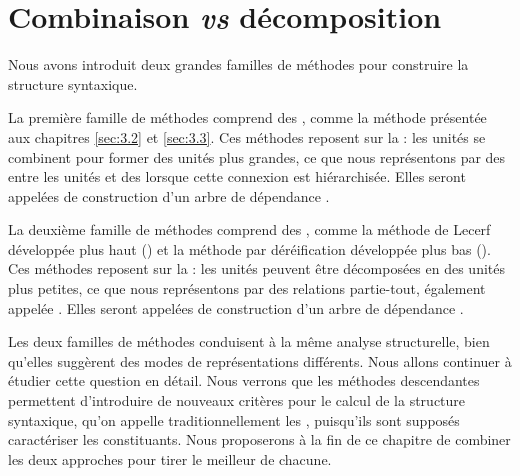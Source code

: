 \section{Combinaison \textit{vs} décomposition}\label{sec:3.4.8}

Nous avons introduit deux grandes familles de méthodes pour construire la structure syntaxique.

La première famille de méthodes comprend des , comme la méthode présentée aux chapitres \ref{sec:3.2} et \ref{sec:3.3}. Ces méthodes reposent sur la  : les unités se combinent pour former des unités plus grandes, ce que nous représentons par des  entre les unités et des  lorsque cette connexion est hiérarchisée. Elles seront appelées  de construction d’un arbre de dépendance .

La deuxième famille de méthodes comprend des , com\-me la méthode de Lecerf développée plus haut () et la méthode par déréification développée plus bas (). Ces méthodes reposent sur la : les unités peuvent être décomposées en des unités plus petites, ce que nous représentons par des relations partie-tout, également appelée . Elles seront appelées  de construction d’un arbre de dépendance .

Les deux familles de méthodes conduisent à la même analyse structurelle, bien qu’elles suggèrent des modes de représentations différents. Nous allons continuer à étudier cette question en détail. Nous verrons que les méthodes descendantes permettent d’introduire de nouveaux critères pour le calcul de la structure syntaxique, qu’on appelle traditionnellement les , puisqu’ils sont supposés caractériser les constituants. Nous proposerons à la fin de ce chapitre de combiner les deux approches pour tirer le meilleur de chacune.\largerpage

